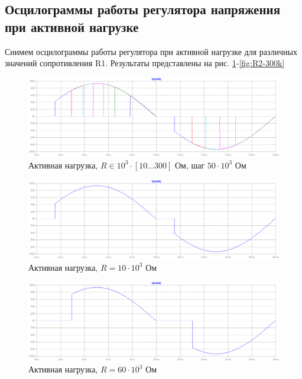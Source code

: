 \documentclass[a4paper, 12pt]{article}
\begin{document}
    \subsection{Осцилограммы работы регулятора напряжения при активной нагрузке}
    Снимем осцилограммы работы регулятора при активной нагрузке
    для различных значений сопротивления R1. Результаты представлены на рис. \ref{fig:R2-all}-\ref{fig:R2-300k}
    \begin{figure}[H]
        \centering
        \includegraphics[scale=0.45]{R2-all.png}
        \captionsetup{skip=0pt}
        \caption{Активная нагрузка, $R\in10^3\cdot\left[ 10...300 \right]$ Ом, шаг $50\cdot10^3$ Ом}
        \label{fig:R2-all}
    \end{figure}
    \begin{figure}[H]
        \centering
        \includegraphics[scale=0.45]{R2-10k.png}
        \captionsetup{skip=0pt}
        \caption{Активная нагрузка, $R=10\cdot10^3$ Ом}
        \label{fig:R2-10k}
    \end{figure}
    \begin{figure}[H]
        \centering
        \includegraphics[scale=0.45]{R2-60k.png}
        \captionsetup{skip=0pt}
        \caption{Активная нагрузка, $R=60\cdot10^3$ Ом}
        \label{fig:R2-60k}
    \end{figure}
\end{document}
